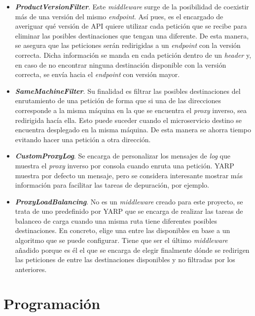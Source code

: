 \documentclass[11pt,spanish,listoffigures]{tfgetsinf}
\begin{document}
\begin{itemize}

	\item \textbf{\emph{ProductVersionFilter}}. Este \emph{middleware} surge de la posibilidad de coexistir más de una versión del mismo \emph{endpoint}. Así pues, es el encargado de averiguar qué versión de API quiere utilizar cada petición que se recibe para eliminar las posibles destinaciones que tengan una diferente. De esta manera, se asegura que las peticiones serán redirigidas a un \emph{endpoint} con la versión correcta. Dicha información se manda en cada petición dentro de un \emph{header} y, en caso de no encontrar ninguna destinación disponible con la versión correcta, se envía hacia el \emph{endpoint} con versión mayor.

	\item \textbf{\emph{SameMachineFilter}}. Su finalidad es filtrar las posibles destinaciones del enrutamiento de una petición de forma que si una de las direcciones corresponde a la misma máquina en la que se encuentra el \emph{proxy} inverso, sea redirigida hacía ella. Esto puede suceder cuando el microservicio destino se encuentra desplegado en la misma máquina. De esta manera se ahorra tiempo evitando hacer una petición a otra dirección.

	\item \textbf{\emph{CustomProxyLog}}. Se encarga de personalizar los mensajes de \emph{log} que muestra el \emph{proxy} inverso por consola cuando enruta una petición. YARP muestra por defecto un mensaje, pero se considera interesante mostrar más información para facilitar las tareas de depuración, por ejemplo.

	\item \textbf{\emph{ProxyLoadBalancing}}. No es un \emph{middleware} creado para este proyecto, se trata de uno predefinido por YARP que se encarga de realizar las tareas de balanceo de carga cuando una misma ruta tiene diferentes posibles destinaciones. En concreto, elige una entre las disponibles en base a un algoritmo que se puede configurar. Tiene que ser el último \emph{middleware} añadido porque es él el que se encarga de elegir finalmente dónde se redirigen las peticiones de entre las destinaciones disponibles y no filtradas por los anteriores.

\end{itemize}


	\section{Programación} \label{programacion}
\end{document}
